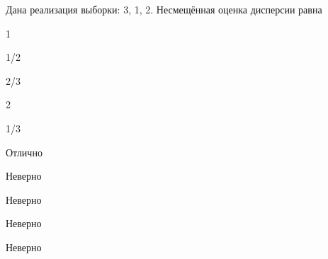 
\begin{question}
Дана реализация выборки: 3, 1, 2. Несмещённая оценка дисперсии равна
\begin{answerlist}
  \item 1
  \item 1/2
  \item 2/3
  \item 2
  \item 1/3
\end{answerlist}
\end{question}

\begin{solution}
\begin{answerlist}
  \item Отлично
  \item Неверно
  \item Неверно
  \item Неверно
  \item Неверно
\end{answerlist}
\end{solution}


